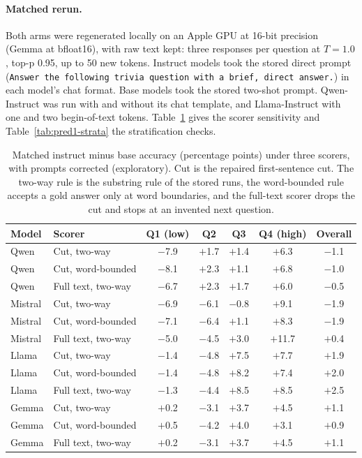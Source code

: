 \paragraph{Matched rerun.} Both arms were regenerated locally on an Apple GPU at 16-bit precision (Gemma at bfloat16), with raw text kept: three responses per question at $T=1.0$, top-p 0.95, up to 50 new tokens. Instruct models took the stored direct prompt (\texttt{Answer the following trivia question with a brief, direct answer.}) in each model's chat format. Base models took the stored two-shot prompt. Qwen-Instruct was run with and without its chat template, and Llama-Instruct with one and two begin-of-text tokens. Table~\ref{tab:pred1-scorers} gives the scorer sensitivity and Table~\ref{tab:pred1-strata} the stratification checks.

\begin{table}[h]
\centering
\footnotesize
\begin{tabular}{llccccc}
\toprule
Model & Scorer & Q1 (low) & Q2 & Q3 & Q4 (high) & Overall \\
\midrule
Qwen & Cut, two-way & $-$7.9 & $+$1.7 & $+$1.4 & $+$6.3 & $-$1.1 \\
Qwen & Cut, word-bounded & $-$8.1 & $+$2.3 & $+$1.1 & $+$6.8 & $-$1.0 \\
Qwen & Full text, two-way & $-$6.7 & $+$2.3 & $+$1.7 & $+$6.0 & $-$0.5 \\
Mistral & Cut, two-way & $-$6.9 & $-$6.1 & $-$0.8 & $+$9.1 & $-$1.9 \\
Mistral & Cut, word-bounded & $-$7.1 & $-$6.4 & $+$1.1 & $+$8.3 & $-$1.9 \\
Mistral & Full text, two-way & $-$5.0 & $-$4.5 & $+$3.0 & $+$11.7 & $+$0.4 \\
Llama & Cut, two-way & $-$1.4 & $-$4.8 & $+$7.5 & $+$7.7 & $+$1.9 \\
Llama & Cut, word-bounded & $-$1.4 & $-$4.8 & $+$8.2 & $+$7.4 & $+$2.0 \\
Llama & Full text, two-way & $-$1.3 & $-$4.4 & $+$8.5 & $+$8.5 & $+$2.5 \\
Gemma & Cut, two-way & $+$0.2 & $-$3.1 & $+$3.7 & $+$4.5 & $+$1.1 \\
Gemma & Cut, word-bounded & $+$0.5 & $-$4.2 & $+$4.0 & $+$3.1 & $+$0.9 \\
Gemma & Full text, two-way & $+$0.2 & $-$3.1 & $+$3.7 & $+$4.5 & $+$1.1 \\
\bottomrule
\end{tabular}
\caption{Matched instruct minus base accuracy (percentage points) under three scorers, with prompts corrected (exploratory). Cut is the repaired first-sentence cut. The two-way rule is the substring rule of the stored runs, the word-bounded rule accepts a gold answer only at word boundaries, and the full-text scorer drops the cut and stops at an invented next question.}
\label{tab:pred1-scorers}
\end{table}


